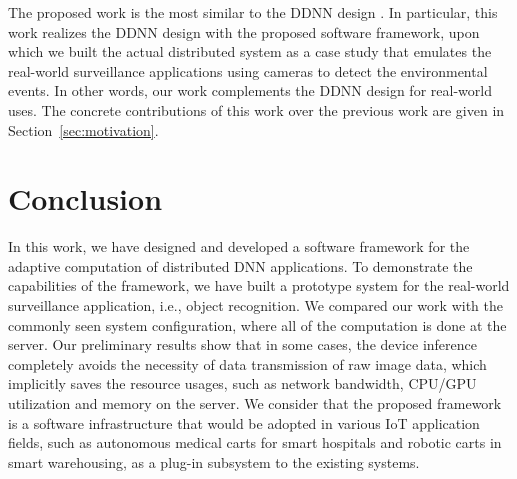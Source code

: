 \documentclass[conference]{IEEEtran}
\begin{document}
The proposed work is the most similar to the DDNN design \cite{Teerapittayanon17} . ​In particular, this work realizes the DDNN design with the proposed software framework, upon which we built the actual distributed system as a case study that emulates the real-world surveillance applications using cameras to detect the environmental events. In other words, our work complements the DDNN design for real-world uses. The concrete contributions of this work over the previous work are given in Section~\ref{sec:motivation}.


\section{Conclusion}
\label{sec:conclusion}
In this work, we have designed and developed a software framework for the adaptive computation of distributed DNN applications. To demonstrate the capabilities of the framework, we have built a prototype system for the real-world surveillance application, i.e., object recognition.
We compared our work with the ​commonly seen system configuration, where all of the computation is done at the server.
Our preliminary results show that in some cases, the device inference completely avoids the necessity of data transmission of raw image data, which implicitly saves the resource usages, such as network bandwidth, CPU/GPU utilization and memory on the server. %
We consider that the proposed framework is a software infrastructure that would be adopted in various IoT application fields, such as autonomous medical carts for smart hospitals and robotic carts in smart warehousing, as a plug-in subsystem to the existing systems.
\end{document}
